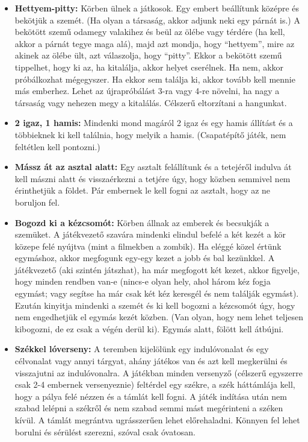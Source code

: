 \documentclass[a4paper, 12pt, twoside, openright]{article}
\begin{document}
\begin{itemize}
\item \textbf{Hettyem-pitty:} Körben ülnek a játkosok. Egy embert beállítunk középre és bekötjük a szemét. (Ha olyan a társaság, akkor adjunk neki egy párnát is.) A bekötött szemű odamegy valakihez és beül az ölébe vagy térdére (ha kell, akkor a párnát tegye maga alá), majd azt mondja, hogy ``hettyem'', mire az akinek az ölébe ült, azt válaszolja, hogy ``pitty''. Ekkor a bekötött szemű tippelhet, hogy ki az, ha kitalálja, akkor helyet cserélnek. Ha nem, akkor próbálkozhat mégegyszer. Ha ekkor sem találja ki, akkor tovább kell mennie más emberhez. Lehet az újrapróbálást 3-ra vagy 4-re növelni, ha nagy a társaság vagy nehezen megy a kitalálás. Célszerű eltorzítani a hangunkat. 

\item \textbf{2 igaz, 1 hamis:} Mindenki mond magáról 2 igaz és egy hamis állítást és a többieknek ki kell találnia, hogy melyik a hamis. (Csapatépítő játék, nem feltétlen kell pontozni.)

\item \textbf{Mássz át az asztal alatt:} Egy asztalt felállítunk és a tetejéről indulva át kell mászni alatt és visszaérkezni a tetjére úgy, hogy közben semmivel nem érinthetjük a földet. Pár embernek le kell fogni az asztalt, hogy az ne boruljon fel.

\item \textbf{Bogozd ki a kézcsomót:} Körben állnak az emberek és becsukják a szemüket. A játékvezető szavára mindenki elindul befelé a két kezét a kör közepe felé nyújtva (mint a filmekben a zombik). Ha eléggé közel értünk egymáshoz, akkor megfogunk egy-egy kezet a jobb és bal kezünkkel. A játékvezető (aki szintén játszhat), ha már megfogott két kezet, akkor figyelje, hogy minden rendben van-e (nincs-e olyan hely, ahol három kéz fogja egymást; vagy segítse ha már csak két kéz keresgél és nem találják  egymást). Ezután kinyitja mindenki a szemét és ki kell bogozni a kézcsomót úgy, hogy nem engedhetjük el egymás kezét közben. (Van olyan, hogy nem lehet teljesen kibogozni, de ez csak a végén derül ki). Egymás alatt, fölött kell átbújni.

\item \textbf{Székkel lóverseny:} A teremben kijelölünk egy indulóvonalat és egy célvonalat vagy annyi tárgyat, ahány játékos van és azt kell megkerülni és visszajutni az indulóvonalra. A játékban minden versenyző (célszerű egyszerre csak 2-4 embernek versenyeznie) feltérdel egy székre, a szék háttámlája kell, hogy a pálya felé nézzen és a támlát kell fogni. A játék indítása után nem szabad lelépni a székről és nem szabad semmi mást megérinteni a széken kívül. A támlát megrántva ugrásszerűen lehet előrehaladni. Könnyen fel lehet borulni és sérülést szerezni, szóval csak óvatosan.


\end{itemize}
\end{document}
